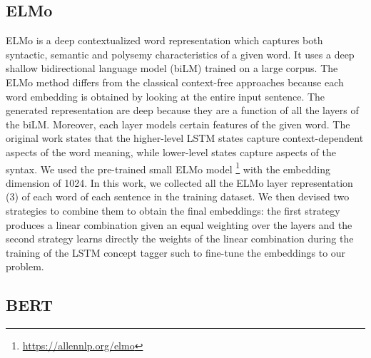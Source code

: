 \documentclass[11pt,a4paper]{article}
\begin{document}
\subsection{ELMo}
ELMo \cite{Peters:2018} is a deep contextualized word representation which captures both syntactic, semantic and polysemy characteristics of a given word. It uses a deep shallow bidirectional language model (biLM) trained on a large corpus. The ELMo method differs from the classical context-free approaches because each word embedding is obtained by looking at the entire input sentence. The generated representation are deep because they are a function of all the layers of the biLM. Moreover, each layer models certain features of the given word. The original work states that the higher-level LSTM states capture context-dependent aspects of the word meaning, while lower-level states capture aspects of the syntax.
We used the pre-trained small ELMo model \footnote{\url{https://allennlp.org/elmo}} with the embedding dimension of 1024.
In this work, we collected all the ELMo layer representation (3) of each word of each sentence in the training dataset. We then devised two strategies to combine them to obtain the final embeddings: the first strategy produces a linear combination given an equal weighting over the layers and the second strategy learns directly the weights of the linear combination during the training of the LSTM concept tagger such to fine-tune the embeddings to our problem.


\subsection{BERT}
\end{document}
